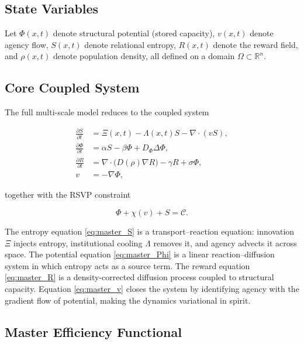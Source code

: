 \documentclass[12pt,a4paper]{article}
\theoremstyle{definition}
\begin{document}
\subsection{State Variables}

Let $\Phi(x,t)$ denote structural potential (stored capacity),
$v(x,t)$ denote agency flow,
$S(x,t)$ denote relational entropy,
$R(x,t)$ denote the reward field,
and $\rho(x,t)$ denote population density,
all defined on a domain $\Omega \subset \mathbb{R}^n$.

\subsection{Core Coupled System}

The full multi-scale model reduces to the coupled system

\begin{align}
  \frac{\partial S}{\partial t}
  &=
  \Xi(x,t)
  - \Lambda(x,t) S
  - \nabla \cdot (v S),
  \label{eq:master_S} \\[6pt]
  \frac{\partial \Phi}{\partial t}
  &=
  \alpha S
  - \beta \Phi
  + D_\Phi \Delta \Phi,
  \label{eq:master_Phi} \\[6pt]
  \frac{\partial R}{\partial t}
  &=
  \nabla \cdot \big(D(\rho)\nabla R\big)
  - \gamma R
  + \sigma \Phi,
  \label{eq:master_R} \\[6pt]
  v
  &=
  -\nabla \Phi,
  \label{eq:master_v}
\end{align}

together with the RSVP constraint

\begin{equation}
  \Phi + \chi(v) + S = \mathcal{C}.
  \label{eq:master_constraint}
\end{equation}

The entropy equation \eqref{eq:master_S} is a transport–reaction equation:
innovation $\Xi$ injects entropy, institutional cooling $\Lambda$ removes it,
and agency advects it across space.  The potential equation
\eqref{eq:master_Phi} is a linear reaction–diffusion system in which entropy
acts as a source term.  The reward equation \eqref{eq:master_R} is a
density-corrected diffusion process coupled to structural capacity.
Equation \eqref{eq:master_v} closes the system by identifying agency with
the gradient flow of potential, making the dynamics variational in spirit.

\subsection{Master Efficiency Functional}
\end{document}
